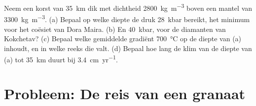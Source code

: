 \begin{exercise}[$\star\star\star$]\label{exo:b2:pt-paths:12}
Neem een korst van \qty{35}{km} dik met dichtheid \qty{2800}{kg.m^{-3}} boven een mantel van
\qty{3300}{kg.m^{-3}}. (a) Bepaal op welke diepte de druk \qty{28}{kbar} bereikt, het
minimum voor het coësiet van Dora Maira. (b) En \qty{40}{kbar}, voor de diamanten van Kokchetav?
(c) Bepaal welke gemiddelde gradiënt \qty{700}{\celsius} op de diepte van (a) inhoudt, en in welke
reeks die valt. (d) Bepaal hoe lang de klim van de diepte
van (a) tot \qty{35}{km} duurt bij \qty{3.4}{cm.yr^{-1}}.
\end{exercise}

\section{Probleem: De reis van een granaat}

